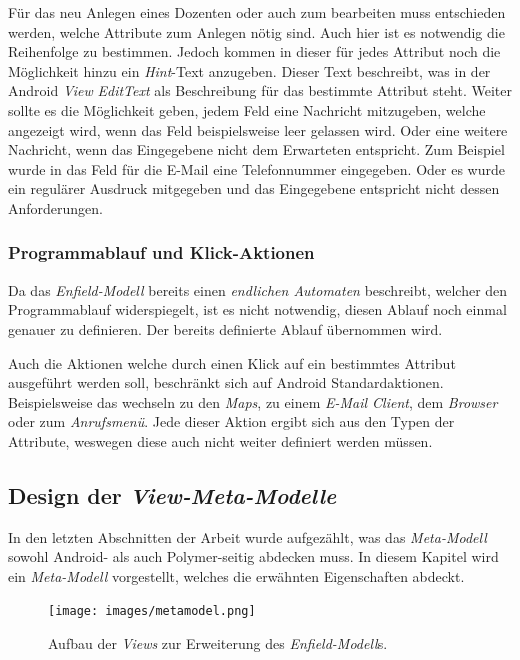 Für das neu Anlegen eines Dozenten oder auch zum bearbeiten muss entschieden werden, welche Attribute zum Anlegen nötig sind. Auch hier ist es notwendig die Reihenfolge zu bestimmen. Jedoch kommen in dieser \textit{} für jedes Attribut noch die Möglichkeit hinzu ein \textit{Hint}-Text anzugeben. Dieser Text beschreibt, was in der Android \textit{View} \textit{EditText} als Beschreibung für das bestimmte Attribut steht. Weiter sollte es die Möglichkeit geben, jedem Feld eine Nachricht mitzugeben, welche angezeigt wird, wenn das Feld beispielsweise leer gelassen wird. Oder eine weitere Nachricht, wenn das Eingegebene nicht dem Erwarteten entspricht. Zum Beispiel wurde in das Feld für die E-Mail eine Telefonnummer eingegeben. Oder es wurde ein regulärer Ausdruck mitgegeben und das Eingegebene entspricht nicht dessen Anforderungen.

\subsubsection{Programmablauf und Klick-Aktionen}

Da das \textit{Enfield-Modell} bereits einen \textit{endlichen Automaten} beschreibt, welcher den Programmablauf widerspiegelt, ist es nicht notwendig, diesen Ablauf noch einmal genauer zu definieren. Der bereits definierte Ablauf übernommen wird.

Auch die Aktionen welche durch einen Klick auf ein bestimmtes Attribut ausgeführt werden soll, beschränkt sich auf Android Standardaktionen. Beispielsweise das wechseln zu den \textit{Maps}, zu einem \textit{E-Mail Client}, dem \textit{Browser} oder zum \textit{Anrufsmenü}. Jede dieser Aktion ergibt sich aus den Typen der Attribute, weswegen diese auch nicht weiter definiert werden müssen.

\subsection{Design der \textit{View-Meta-Modelle}} \label{sec:resourceViews}

In den letzten Abschnitten der Arbeit wurde aufgezählt, was das \textit{Meta-Modell} sowohl Android- als auch Polymer-seitig abdecken muss. In diesem Kapitel wird ein \textit{Meta-Modell} vorgestellt, welches die erwähnten Eigenschaften abdeckt.


\begin{figure}[H]
	\begin{center}
		\texttt{[image: images/metamodel.png]}
		\caption{Aufbau der \textit{Views} zur Erweiterung des \textit{Enfield-Modell}s.}
		\label{fig:meta-model}
	\end{center}
\end{figure}

